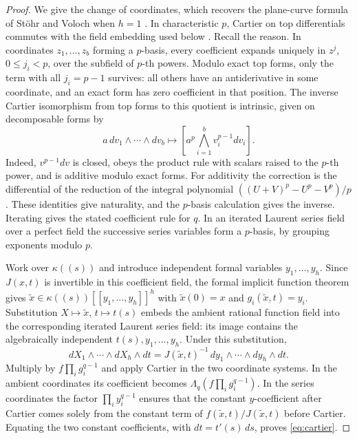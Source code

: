 \documentclass[11pt,letterpaper]{article}
\theoremstyle{definition}
\numberwithin{equation}{section}
\begin{document}
\begin{proof}
We give the change of coordinates, which recovers the plane-curve formula of Stöhr
and Voloch when $h=1$ \cite[Theorem 1.1]{StoehrVoloch}. In characteristic $p$, Cartier on top differentials
commutes with the field embedding used below \cite{Cartier,Katz}. Recall the reason. In coordinates
$z_1,\ldots,z_b$ forming a $p$-basis, every coefficient expands uniquely in $z^j$, $0\le j_i<p$, over the
subfield of $p$-th powers. Modulo exact top forms, only the term with all $j_i=p-1$ survives:
all others have an antiderivative in some coordinate, and an exact form has zero coefficient in
that position. The inverse Cartier isomorphism from top forms to this quotient is intrinsic,
given on decomposable forms by
\[
  a\,dv_1\wedge\cdots\wedge dv_b \longmapsto \left[a^p\bigwedge_{i=1}^b v_i^{p-1}dv_i\right].
\]
Indeed, $v^{p-1}dv$ is closed, obeys the product rule with scalars raised to the $p$-th power, and is
additive modulo exact forms. For additivity the correction is the differential of the reduction
of the integral polynomial $((U+V)^p-U^p-V^p)/p$. These identities give naturality, and the
$p$-basis calculation gives the inverse. Iterating gives the stated coefficient rule for $q$. In an
iterated Laurent series field over a perfect field the successive series variables form a $p$-basis,
by grouping exponents modulo $p$.

Work over $\kappa((s))$ and introduce independent formal variables $y_1,\ldots,y_h$. Since
$J(x,t)$ is invertible in this coefficient field, the formal implicit function theorem gives
$\widetilde{x}\in \kappa((s))[[y_1,\ldots,y_h]]^h$ with $\widetilde{x}(0)=x$ and
$g_i(\widetilde{x},t)=y_i$. Substitution $X\mapsto\widetilde{x}$, $t\mapsto t(s)$
embeds the ambient rational function field into the corresponding iterated Laurent series field:
its image contains the algebraically independent $t(s),y_1,\ldots,y_h$. Under this substitution,
\[
  dX_1\wedge\cdots\wedge dX_h\wedge dt = J(\widetilde{x},t)^{-1}\,dy_1\wedge\cdots\wedge dy_h\wedge dt.
\]
Multiply by $f\prod_i g_i^{q-1}$ and apply Cartier in the two coordinate systems. In the ambient
coordinates its coefficient becomes $\Lambda_q(f\prod_i g_i^{q-1})$. In the series coordinates the
factor $\prod_i y_i^{q-1}$
ensures that the constant $y$-coefficient after Cartier comes solely from the constant term
of $f(\widetilde{x},t)/J(\widetilde{x},t)$ before Cartier. Equating the two constant coefficients,
with $dt=t'(s)\,ds$,
proves \eqref{eq:cartier}.
\end{proof}
\end{document}
